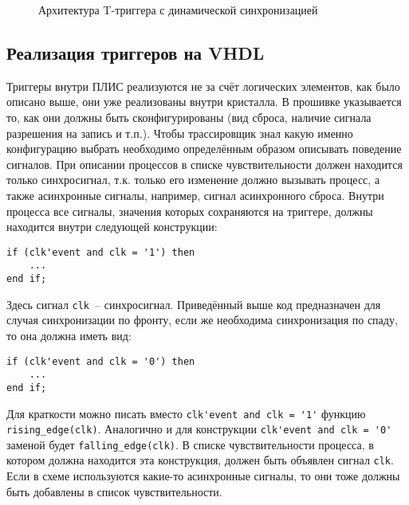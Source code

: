 \begin{figure}[ht]
\centering
{}
\caption{Архитектура T-триггера с динамической синхронизацией}
\label{T_trigger_arch}
\end{figure}

\subsection{Реализация триггеров на VHDL}

Триггеры внутри ПЛИС реализуются не за счёт логических элементов, как было описано выше, они уже реализованы внутри кристалла. В прошивке указывается то, как они должны быть сконфигурированы (вид сброса, наличие сигнала разрешения на запись и т.п.). Чтобы трассировщик знал какую именно конфигурацию выбрать необходимо определённым образом описывать поведение сигналов. При описании процессов в списке чувствительности должен находится только синхросигнал, т.к. только его изменение должно вызывать процесс, а также асинхронные сигналы, например, сигнал асинхронного сброса. Внутри процесса все сигналы, значения которых сохраняются на триггере, должны находится внутри следующей конструкции:

\begin{Code}
\begin{lstlisting}
if (clk'event and clk = '1') then
    ...
end if;
\end{lstlisting}
\end{Code}

Здесь сигнал \lstinline?clk?~-- синхросигнал.
Приведённый выше код предназначен для случая синхронизации по фронту, если же необходима синхронизация по спаду, то она должна иметь вид:

\begin{Code}
\begin{lstlisting}
if (clk'event and clk = '0') then
    ...
end if;
\end{lstlisting}
\end{Code}

Для краткости можно писать вместо \lstinline?clk'event and clk = '1'? функцию \lstinline?rising_edge(clk)?. Аналогично и для конструкции \lstinline?clk'event and clk = '0'? заменой будет \lstinline?falling_edge(clk)?. В списке чувствительности процесса, в котором должна находится эта конструкция, должен быть объявлен сигнал \lstinline?clk?. Если в схеме используются какие-то асинхронные сигналы, то они тоже должны быть добавлены в список чувствительности.

